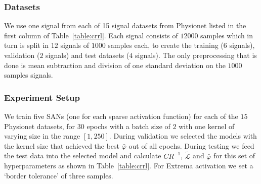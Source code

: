 \documentclass[journal]{IEEEtran}
\begin{document}
\subsubsection{Datasets}
We use one signal from each of 15 signal datasets from Physionet
listed in the first column of Table~\ref{table:crrl}.
Each signal consists of $12000$ samples which in turn is split in
$12$ signals of $1000$ samples each, to create the training ($6$
signals), validation ($2$ signals) and test datasets ($4$ signals).
The only preprocessing that is done is mean subtraction and division
of one standard deviation on the $1000$ samples signals.
\subsubsection{Experiment Setup}
We train five SANs (one for each sparse activation function) for each
of the $15$ Physionet datasets, for $30$ epochs with a batch size of
$2$ with one kernel of varying size in the range $[1, 250]$.
During validation we selected the models with the kernel size that
achieved the best $\bar\varphi$ out of all epochs.
During testing we feed the test data into the selected model and
calculate $CR^{-1}$, $\tilde{\mathcal{L}}$ and $\bar\varphi$ for this
set of hyperparameters as shown in Table~\ref{table:crrl}.
For Extrema activation we set a `border tolerance' of three samples.
\end{document}
